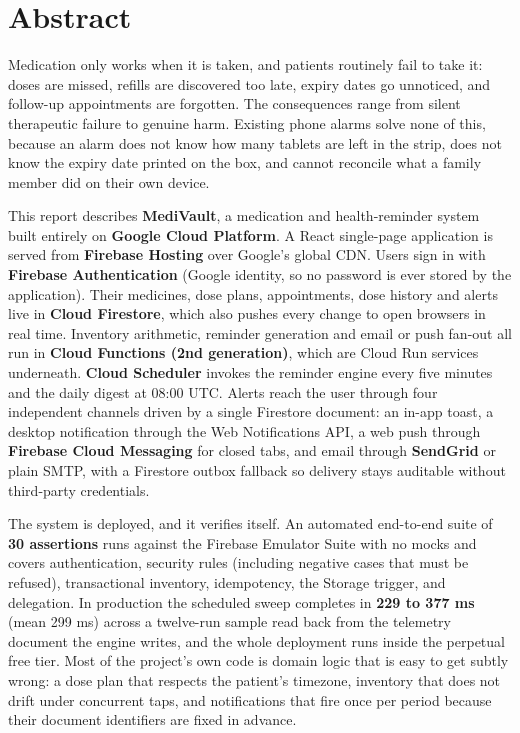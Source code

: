 \documentclass[11pt,a4paper]{report}
\begin{document}
\chapter*{Abstract}

Medication only works when it is taken, and patients routinely fail to take it: doses are missed,
refills are discovered too late, expiry dates go unnoticed, and follow-up appointments are forgotten.
The consequences range from silent therapeutic failure to genuine harm. Existing phone alarms solve
none of this, because an alarm does not know how many tablets are left in the strip, does not know the
expiry date printed on the box, and cannot reconcile what a family member did on their own device.

This report describes \textbf{MediVault}, a medication and health-reminder system built entirely on
\textbf{Google Cloud Platform}. A React single-page application is served from \textbf{Firebase
Hosting} over Google's global CDN. Users sign in with \textbf{Firebase Authentication} (Google
identity, so no password is ever stored by the application). Their medicines, dose plans,
appointments, dose history and alerts live in \textbf{Cloud Firestore}, which also pushes every change
to open browsers in real time. Inventory arithmetic, reminder generation and email or push fan-out all
run in \textbf{Cloud Functions (2nd generation)}, which are Cloud Run services underneath. \textbf{Cloud Scheduler} invokes the reminder engine every five minutes
and the daily digest at 08:00 UTC. Alerts reach the user through four independent channels driven by a
single Firestore document: an in-app toast, a desktop notification through the Web Notifications API, a
web push through \textbf{Firebase Cloud Messaging} for closed tabs, and email through \textbf{SendGrid}
or plain SMTP, with a Firestore outbox fallback so delivery stays auditable without third-party
credentials.

The system is deployed, and it verifies itself. An automated end-to-end
suite of \textbf{30 assertions} runs against the Firebase Emulator Suite with no mocks and covers
authentication, security rules (including negative cases that must be refused), transactional
inventory, idempotency, the Storage trigger, and delegation. In production the scheduled sweep completes
in \textbf{229 to 377 ms} (mean 299 ms) across a twelve-run sample read back from the telemetry document
the engine writes, and the whole deployment runs inside the perpetual free tier. Most of the project's
own code is domain logic that is easy to get subtly wrong: a dose plan that respects the patient's
timezone, inventory that does not drift under concurrent taps, and notifications that fire once per
period because their document identifiers are fixed in advance.
\end{document}
